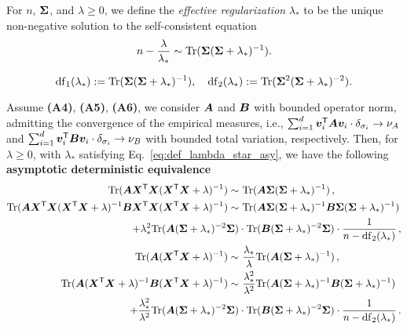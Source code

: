 \begin{definition}
    For $n$, ${\boldsymbol \Sigma}$, and $\lambda \geq 0$, we define the \emph{effective regularization} $\lambda_*$ to be the unique non-negative solution to the self-consistent equation
\begin{equation}\label{eq:def_lambda_star_asy}
    n - \frac{\lambda}{\lambda_*} \sim {\rm Tr} ( {\boldsymbol \Sigma} ( {\boldsymbol \Sigma} + \lambda_* )^{-1} ).
\end{equation}
\end{definition}

\begin{definition}\label{def:df}
\[
{\rm df}_1(\lambda_*) := {\rm Tr} ( {\boldsymbol \Sigma} ( {\boldsymbol \Sigma} + \lambda_*)^{-1}), \quad {\rm df}_2(\lambda_*) := {\rm Tr} ( {\boldsymbol \Sigma}^2 ( {\boldsymbol \Sigma} + \lambda_*)^{-2}).
\]
\end{definition}

\begin{proposition}\citep[Restatement of Proposition 1]{bach2024high}\label{prop:spectral}
    Assume \textbf{(A4)}, \textbf{(A5)}, \textbf{(A6)}, we consider ${\boldsymbol A}$ and ${\boldsymbol B}$ with bounded operator norm, admitting the convergence of the empirical measures, i.e., $ \sum_{i=1}^d   {\boldsymbol v}_i^{\mathsf T} {\boldsymbol A} {\boldsymbol v}_i  \cdot\delta_{\sigma_i} \rightarrow \nu_A$
    and $ \sum_{i=1}^d   {\boldsymbol v}_i^{\mathsf T} {\boldsymbol B} {\boldsymbol v}_i  \cdot\delta_{\sigma_i} \rightarrow \nu_B$ with bounded total variation, respectively. Then, for $\lambda \geq 0$, with $\lambda_*$ satisfying Eq.~\eqref{eq:def_lambda_star_asy},
    we have the following {\bf asymptotic deterministic equivalence}
    \begin{align}
        \label{eq:trA1}
        {\rm Tr} ( {\boldsymbol A} {\boldsymbol X}^{\mathsf T} {\boldsymbol X} ( {\boldsymbol X}^{\mathsf T} {\boldsymbol X} +\lambda )^{-1} ) \sim&~ {\rm Tr} ( {\boldsymbol A} {\boldsymbol \Sigma} ( {\boldsymbol \Sigma} + \lambda_* )^{-1} )\,,
        \\
        \label{eq:trAB1}
        {\rm Tr} ( {\boldsymbol A} {\boldsymbol X}^{\mathsf T} {\boldsymbol X} ( {\boldsymbol X}^{\mathsf T} {\boldsymbol X} + \lambda )^{-1} {\boldsymbol B} {\boldsymbol X}^{\mathsf T} {\boldsymbol X} ( {\boldsymbol X}^{\mathsf T} {\boldsymbol X} + \lambda )^{-1}) \sim&~ {\rm Tr} ( {\boldsymbol A} {\boldsymbol \Sigma} ( {\boldsymbol \Sigma} + \lambda_* )^{-1} {\boldsymbol B} {\boldsymbol \Sigma} ( {\boldsymbol \Sigma} + \lambda_* )^{-1} ) \nonumber \\
        + \lambda_*^2 {\rm Tr} ( {\boldsymbol A} ( {\boldsymbol \Sigma} + \lambda_* )^{-2}  {\boldsymbol \Sigma} ) &\cdot {\rm Tr} ( {\boldsymbol B} ( {\boldsymbol \Sigma} + \lambda_* )^{-2} {\boldsymbol \Sigma} ) \cdot \frac{1}{ n -  {\rm df}_2(\lambda_*) }\,,\\
        \label{eq:trA2}
        {\rm Tr} ( {\boldsymbol A} ( {\boldsymbol X}^{\mathsf T} {\boldsymbol X} +\lambda )^{-1} ) \sim&~ \frac{\lambda_*}{\lambda} {\rm Tr} ( {\boldsymbol A} ( {\boldsymbol \Sigma} + \lambda_* )^{-1} )\,,
        \\
        \label{eq:trAB2}
        {\rm Tr} ( {\boldsymbol A} ( {\boldsymbol X}^{\mathsf T} {\boldsymbol X} + \lambda )^{-1} {\boldsymbol B} ( {\boldsymbol X}^{\mathsf T} {\boldsymbol X} + \lambda )^{-1}) \sim&~ \frac{\lambda_*^2}{\lambda^2} {\rm Tr} ( {\boldsymbol A} ( {\boldsymbol \Sigma} + \lambda_* )^{-1} {\boldsymbol B} ( {\boldsymbol \Sigma} + \lambda_* )^{-1} ) \nonumber \\
        + \frac{\lambda_*^2}{\lambda^2} {\rm Tr} ( {\boldsymbol A} ( {\boldsymbol \Sigma} + \lambda_* )^{-2}  {\boldsymbol \Sigma} ) &\cdot {\rm Tr} ( {\boldsymbol B} ( {\boldsymbol \Sigma} + \lambda_* )^{-2} {\boldsymbol \Sigma} ) \cdot \frac{1}{ n -  {\rm df}_2(\lambda_*) }\,.
    \end{align}
\end{proposition}

